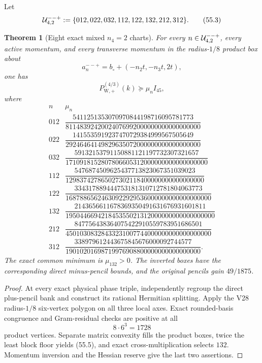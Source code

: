 \documentclass[11pt,oneside]{article}
\newtheorem{theorem}{Theorem}[section]
\theoremstyle{definition}
\theoremstyle{remark}
\begin{document}
Let
\[
 {\cal U}_{4,2}^{--+}
 :=\{012,022,032,112,122,132,212,312\}.               \tag{55.3}
\]

\begin{theorem}[Eight exact mixed \(n_4=2\) charts]
\label{thm:newv55-eight-charts}
For every \(n\in{\cal U}_{4,2}^{--+}\), every active momentum, and
every transverse momentum in the radius-\(1/8\) product box about
\[
 a_n^{--+}=b_\circ+(-n_2t,-n_3t,2t),
\]
one has
\[
 P_{\mathrm W,+}^{(4/3)}(k)\succeq\mu_n I_{45},       \tag{55.4}
\]
where
\[
\begin{array}{c|c}
n&\mu_n\\ \hline
012&\dfrac{5411251353070970844198716095781773}
{81148392420024076992000000000000000000}\\[5pt]
022&\dfrac{1415535919237470729384999567505649}
{29246464149829635072000000000000000000}\\[5pt]
032&\dfrac{59132153791150881121197732307321657}
{1710918152807806605312000000000000000000}\\[5pt]
112&\dfrac{5476874509625437713823067351039023}
{129837427865027302118400000000000000000}\\[5pt]
122&\dfrac{334317889444753181310712781804063773}
{16878865624630922929536000000000000000000}\\[5pt]
132&\dfrac{2143656611678369350491631676931601811}
{195044669421845355021312000000000000000000}\\[5pt]
212&\dfrac{847756438364075422910559783951686501}
{45010308328433231007744000000000000000000}\\[5pt]
312&\dfrac{338979612443675845676000092744577}
{19010201698719976908800000000000000000}.
\end{array}                                             \tag{55.5}
\]
The exact common minimum is \(\mu_{132}>0\).  The inverted boxes
have the corresponding direct minus-pencil bounds, and the
original pencils gain \(49/1875\).
\end{theorem}

\begin{proof}
At every exact physical phase triple, independently regroup the
direct plus-pencil bank and construct its rational Hermitian
splitting.  Apply the V28 radius-\(1/8\) six-vertex polygon on all
three local axes.  Exact rounded-basis congruence and Gram-residual
checks are positive at all
\[
 8\cdot6^3=1728                                       \tag{55.6}
\]
product vertices.  Separate matrix convexity fills the product
boxes, twice the least block floor yields (55.5), and exact
cross-multiplication selects \(132\).  Momentum inversion and the
Hessian reserve give the last two assertions.
\end{proof}
\end{document}

